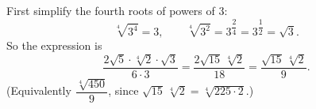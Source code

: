 First simplify the fourth roots of powers of $3$:
\[
\sqrt[4]{3^4}=3,\qquad \sqrt[4]{3^2}=3^{\dfrac{2}{4}}=3^{\dfrac{1}{2}}=\sqrt3 .
\]
So the expression is
\[
\dfrac{2\sqrt5\cdot\sqrt[4]{2}\cdot\sqrt3}{6\cdot3}=\dfrac{2\sqrt{15}\,\sqrt[4]{2}}{18}=\boxed{\dfrac{\sqrt{15}\,\sqrt[4]{2}}{9}} .
\]
(Equivalently $\dfrac{\sqrt[4]{450}}{9}$, since $\sqrt{15}\,\sqrt[4]{2}=\sqrt[4]{225\cdot2}$.)
